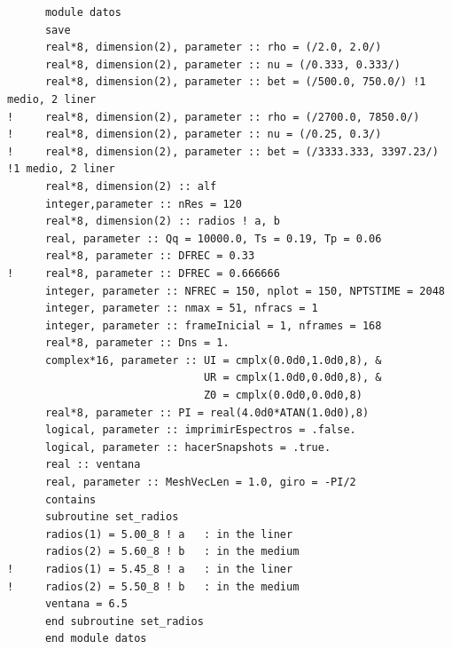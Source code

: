 \documentclass [11pt,spanish]{article}
\begin{document}
\begin{shaded}
\begin{verbatim}
      module datos
      save
      real*8, dimension(2), parameter :: rho = (/2.0, 2.0/)
      real*8, dimension(2), parameter :: nu = (/0.333, 0.333/)
      real*8, dimension(2), parameter :: bet = (/500.0, 750.0/) !1 medio, 2 liner
!     real*8, dimension(2), parameter :: rho = (/2700.0, 7850.0/)
!     real*8, dimension(2), parameter :: nu = (/0.25, 0.3/)
!     real*8, dimension(2), parameter :: bet = (/3333.333, 3397.23/) !1 medio, 2 liner
      real*8, dimension(2) :: alf
      integer,parameter :: nRes = 120
      real*8, dimension(2) :: radios ! a, b 
      real, parameter :: Qq = 10000.0, Ts = 0.19, Tp = 0.06
      real*8, parameter :: DFREC = 0.33
!     real*8, parameter :: DFREC = 0.666666
      integer, parameter :: NFREC = 150, nplot = 150, NPTSTIME = 2048
      integer, parameter :: nmax = 51, nfracs = 1
      integer, parameter :: frameInicial = 1, nframes = 168
      real*8, parameter :: Dns = 1.
      complex*16, parameter :: UI = cmplx(0.0d0,1.0d0,8), &
                               UR = cmplx(1.0d0,0.0d0,8), &
                               Z0 = cmplx(0.0d0,0.0d0,8)
      real*8, parameter :: PI = real(4.0d0*ATAN(1.0d0),8)
      logical, parameter :: imprimirEspectros = .false.
      logical, parameter :: hacerSnapshots = .true.
      real :: ventana
      real, parameter :: MeshVecLen = 1.0, giro = -PI/2
      contains
      subroutine set_radios
      radios(1) = 5.00_8 ! a   : in the liner
      radios(2) = 5.60_8 ! b   : in the medium
!     radios(1) = 5.45_8 ! a   : in the liner
!     radios(2) = 5.50_8 ! b   : in the medium
      ventana = 6.5
      end subroutine set_radios
      end module datos
\end{verbatim}
\end{shaded}
\endgroup
\end{document}
